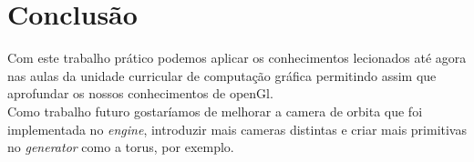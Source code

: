 \documentclass[a4paper]{report}
\begin{document}
\chapter{Conclusão}
Com este trabalho prático podemos aplicar os conhecimentos lecionados até agora
nas aulas da unidade curricular de computação gráfica permitindo assim que
aprofundar os nossos conhecimentos de openGl.\\
Como trabalho futuro gostaríamos de melhorar a camera de orbita que foi
implementada no \textit{engine}, introduzir mais cameras distintas e criar mais
primitivas no \textit{generator} como a torus, por exemplo.
\end{document}
